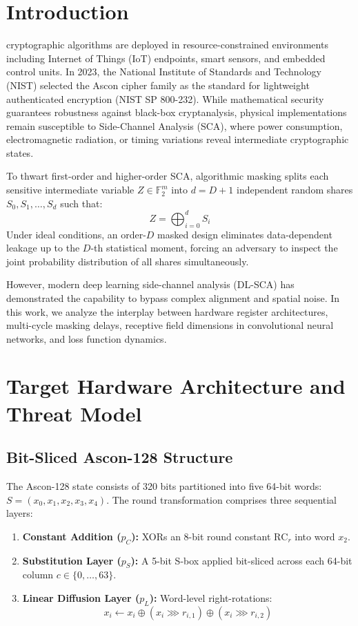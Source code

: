 \documentclass[journal,10pt,twocolumn]{IEEEtran}
\begin{document}
\section{Introduction}
 cryptographic algorithms are deployed in resource-constrained environments including Internet of Things (IoT) endpoints, smart sensors, and embedded control units. In 2023, the National Institute of Standards and Technology (NIST) selected the Ascon cipher family as the standard for lightweight authenticated encryption (NIST SP 800-232). While mathematical security guarantees robustness against black-box cryptanalysis, physical implementations remain susceptible to Side-Channel Analysis (SCA), where power consumption, electromagnetic radiation, or timing variations reveal intermediate cryptographic states.

To thwart first-order and higher-order SCA, algorithmic masking splits each sensitive intermediate variable $Z \in \mathbb{F}_2^m$ into $d = D + 1$ independent random shares $S_0, S_1, \dots, S_d$ such that:
\begin{equation}
Z = \bigoplus_{i=0}^d S_i
\end{equation}
Under ideal conditions, an order-$D$ masked design eliminates data-dependent leakage up to the $D$-th statistical moment, forcing an adversary to inspect the joint probability distribution of all shares simultaneously.

However, modern deep learning side-channel analysis (DL-SCA) has demonstrated the capability to bypass complex alignment and spatial noise. In this work, we analyze the interplay between hardware register architectures, multi-cycle masking delays, receptive field dimensions in convolutional neural networks, and loss function dynamics.

\section{Target Hardware Architecture and Threat Model}

\subsection{Bit-Sliced Ascon-128 Structure}
The Ascon-128 state consists of 320 bits partitioned into five 64-bit words: $S = (x_0, x_1, x_2, x_3, x_4)$. The round transformation comprises three sequential layers:
\begin{enumerate}
    \item \textbf{Constant Addition ($p_C$):} XORs an 8-bit round constant $\text{RC}_r$ into word $x_2$.
    \item \textbf{Substitution Layer ($p_S$):} A 5-bit S-box applied bit-sliced across each 64-bit column $c \in \{0, \dots, 63\}$.
    \item \textbf{Linear Diffusion Layer ($p_L$):} Word-level right-rotations:
    \begin{equation}
    x_i \leftarrow x_i \oplus (x_i \ggg r_{i,1}) \oplus (x_i \ggg r_{i,2})
    \end{equation}
\end{enumerate}
\end{document}
